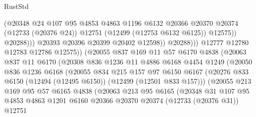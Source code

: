 \begin{lexlean}{RustStd}
\begin{coremodule}
                                  (@20348
                                    @24
                                    @107
                                    @95
                                    @4853
                                    @4863
                                    @1196
                                    @6132
                                    @20366
                                    @20370
                                    @20374
                                    (@12733 (@20376 @24))
                                    @12751
                                    (@12499 (@12753 @6132 @6125))
                                    @12575))
                                @20288)))
                          @20393
                          @20396
                          @20399
                          @20402
                          @12598))
                      @20288)))
                @12777
                @12780
                @12783
                @12786
                @12575))
            (@20055
              @837
              @169
              @11
              @57
              @6170
              @4838
              (@20063
                @837
                @11
                @6170
                (@20308
                  @836
                  @1236
                  @11
                  @4886
                  @6168
                  @4454
                  @1249
                  (@20050
                    @836
                    @1236
                    @6168
                    (@20055
                      @834
                      @215
                      @157
                      @97
                      @6150
                      @6167
                      (@20276 @833 @6150 (@12494 (@12495 @6150)) (@12499 (@12501 @833 @157)))
                      (@20055
                        @213
                        @169
                        @95
                        @57
                        @6165
                        @4838
                        (@20063
                          @213
                          @95
                          @6165
                          (@20348
                            @31
                            @107
                            @95
                            @4853
                            @4863
                            @1201
                            @6160
                            @20366
                            @20370
                            @20374
                            (@12733 (@20376 @31))
                            @12751

\end{coremodule}
\end{lexlean}

